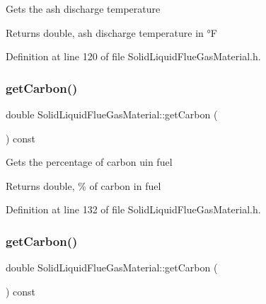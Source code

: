 Gets the ash discharge temperature \begin{DoxyReturn}{Returns}
double, ash discharge temperature in °F 
\end{DoxyReturn}


Definition at line 120 of file Solid\+Liquid\+Flue\+Gas\+Material.\+h.

\mbox{\label{class_solid_liquid_flue_gas_material_a7b8a98111943d30094e2d6950f7f2ec1}} 
\subsubsection{\texorpdfstring{get\+Carbon()}{getCarbon()}\hspace{0.1cm}{\footnotesize\ttfamily [1/3]}}
{\footnotesize\ttfamily double Solid\+Liquid\+Flue\+Gas\+Material\+::get\+Carbon (\begin{DoxyParamCaption}{ }\end{DoxyParamCaption}) const\hspace{0.3cm}{\ttfamily [inline]}}

Gets the percentage of carbon uin fuel \begin{DoxyReturn}{Returns}
double, \% of carbon in fuel 
\end{DoxyReturn}


Definition at line 132 of file Solid\+Liquid\+Flue\+Gas\+Material.\+h.

\mbox{\label{class_solid_liquid_flue_gas_material_a7b8a98111943d30094e2d6950f7f2ec1}} 
\subsubsection{\texorpdfstring{get\+Carbon()}{getCarbon()}\hspace{0.1cm}{\footnotesize\ttfamily [2/3]}}
{\footnotesize\ttfamily double Solid\+Liquid\+Flue\+Gas\+Material\+::get\+Carbon (\begin{DoxyParamCaption}{ }\end{DoxyParamCaption}) const\hspace{0.3cm}{\ttfamily [inline]}}

